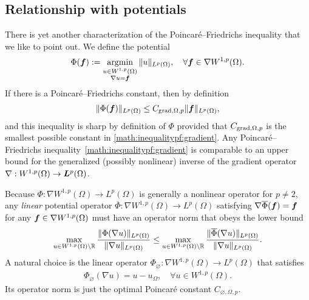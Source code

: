 \documentclass[10pt,a4paper]{article}
\begin{document}
\subsection{Relationship with potentials}

There is yet another characterization of the Poincar\'e--Friedrichs inequality that we like to point out. 
We define the potential 
\begin{align*}
    \Phi( \bm{f} ) := \operatorname*{{\rm argmin}}\limits_{ \substack{ u \in W^{1,p}(\Omega) \\ \nabla u = \bm{f} } } \| u \|_{L^{p}(\Omega)},
    \quad 
    \forall 
    \bm{f} \in \nabla W^{1,p}(\Omega)
    .
\end{align*}
If there is a Poincar\'e--Friedrichs constant, then by definition
\begin{align*}
    \| \Phi(\bm{f}) \|_{L^{p}(\Omega)} \leq C_{\operatorname{grad},\Omega,p} \| \bm{f} \|_{L^{p}(\Omega)},
\end{align*}
and this inequality is sharp by definition of $\Phi$ provided that $C_{\operatorname{grad},\Omega,p}$ is the smallest possible constant in \eqref{math:inequalitypf:gradient}. 
Any Poincar\'e--Friedrichs inequality~\eqref{math:inequalitypf:gradient} is comparable to an upper bound for the generalized (possibly nonlinear) inverse of the gradient operator $\nabla : W^{1,p}(\Omega) \rightarrow \bm{L}^{p}(\Omega)$. 

Because $\Phi : \nabla W^{1,p}(\Omega) \rightarrow L^{p}(\Omega)$ is generally a nonlinear operator for $p \neq 2$,
any \emph{linear} potential operator $\overline\Phi : \nabla W^{1,p}(\Omega) \rightarrow L^{p}(\Omega)$
satisfying $\nabla \overline\Phi( \bm{f} ) = \bm{f}$ for any $\bm{f} \in \nabla W^{1,p}(\Omega)$ must have an operator norm that obeys the lower bound 
\begin{align*}
    \max\limits_{ u \in W^{1,p}(\Omega) \setminus {\mathbb R} } 
    \frac{ \| \Phi(\nabla u) \|_{L^{p}(\Omega)} }{ \| \nabla u \|_{L^{p}(\Omega)} }
    \leq 
    \max\limits_{ u \in W^{1,p}(\Omega) \setminus {\mathbb R} } 
    \frac{ \| \overline\Phi(\nabla u) \|_{L^{p}(\Omega)} }{ \| \nabla u \|_{L^{p}(\Omega)} }
    .
\end{align*}
A natural choice is the linear operator $\Phi_{\varnothing} : \nabla W^{1,p}(\Omega) \rightarrow L^{p}(\Omega)$ that satisfies 
\begin{align*}
    \Phi_{\varnothing}( \nabla u ) = u - u_{\Omega},
    \quad 
    \forall 
    u \in W^{1,p}(\Omega)
    .
\end{align*}
Its operator norm is just the optimal Poincar\'e constant $C_{\varnothing,\Omega,p}$.
\end{document}
